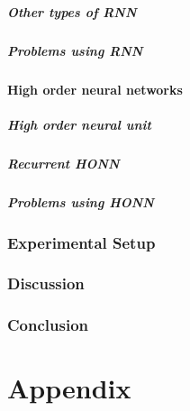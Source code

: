 \documentclass[a4paper, twoside]{article}
\begin{document}
\subsubsection{Other types of RNN}
\label{ssub:other_types_of_rnn}

\subsubsection{Problems using RNN}
\label{ssub:problems_using_rnn}


\subsection{High order neural networks}
\label{sub:high_order_neural_networks}

\subsubsection{High order neural unit}
\label{ssub:high_order_neural_unit}

\subsubsection{Recurrent HONN}
\label{ssub:recurrent_honn}

\subsubsection{Problems using HONN}
\label{ssub:problems_using_honn}


\section{Experimental Setup}
\label{sec:experimental_setup}


\section{Discussion}
\label{sec:discussion}

\section{Conclusion}
\label{sec:conclusion}



\newpage
\nocite{*}
\printbibliography
{}
\newpage

\appendix
\part*{Appendix}
\end{document}
